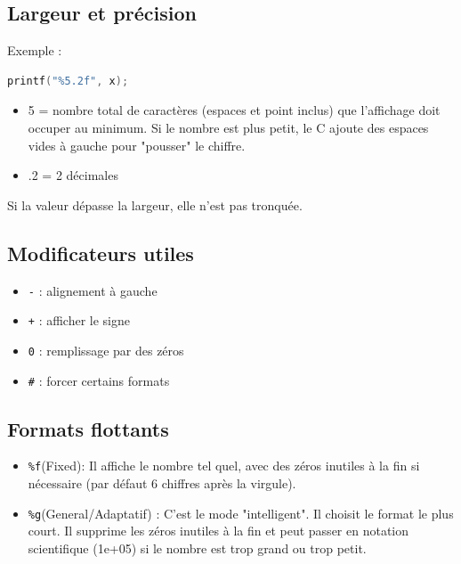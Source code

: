 \subsection{Largeur et précision}

Exemple :

\begin{lstlisting}[language=C]
printf("%5.2f", x);
\end{lstlisting}

\begin{itemize}
    \item 5 = nombre total de caractères (espaces et point inclus) que l'affichage doit occuper au minimum. Si le nombre est plus petit, le C ajoute des espaces vides à gauche pour "pousser" le chiffre.
    \item .2 = 2 décimales
\end{itemize}

Si la valeur dépasse la largeur, elle n’est pas tronquée.

\subsection{Modificateurs utiles}

\begin{itemize}
    \item \texttt{-} : alignement à gauche
    \item \texttt{+} : afficher le signe
    \item \texttt{0} : remplissage par des zéros
    \item \texttt{\#} : forcer certains formats
\end{itemize}

\subsection{Formats flottants}

\begin{itemize}
    \item \texttt{\%f}(Fixed): Il affiche le nombre tel quel, avec des zéros inutiles à la fin si nécessaire (par défaut 6 chiffres après la virgule).
    \item \texttt{\%g}(General/Adaptatif) : C'est le mode "intelligent". Il choisit le format le plus court. Il supprime les zéros inutiles à la fin et peut passer en notation scientifique (1e+05) si le nombre est trop grand ou trop petit.
\end{itemize}

